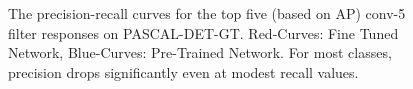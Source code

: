 
\begin{figure}[t!]
\centering
{}
\caption{The precision-recall curves for the top five (based on AP) conv-5 filter responses on PASCAL-DET-GT. Red-Curves: Fine Tuned Network, Blue-Curves: Pre-Trained Network. For most classes, precision drops significantly even at modest recall values. }
\label{fig:ap}
\end{figure}


